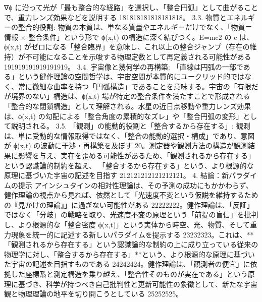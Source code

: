\documentclass{article}
\begin{document}
∇ϕ に沿って光が「最も整合的な経路」を選択し、「整合円弧」として曲がることで、重力レンズ効果などを説明する 181818181818181818。
3.3. 物質とエネルギーの整合的役割:
物質の本質は、単なる質量やエネルギーだけでなく、「物質＝情報 × 整合条件」という形で 
ϕ(x,t) の構造に深く結びつく。E=mc2 の c は、ϕ(x,t) がゼロになる「整合臨界」を意味し、これ以上の整合ジャンプ（存在の維持）が不可能になることを示唆する物理定数として再定義される可能性がある 191919191919191919。
3.4. 宇宙像と幾何学の再構築:
「直線は円弧の一部である」という健作理論の空間哲学は、宇宙空間が本質的にユークリッド的ではなく、常に微細な曲率を持つ「円弧構造」であることを意味する。宇宙の「有限だが境界のない」構造は、ϕ(x,t) 場が特定の整合条件を満たすことで形成される「整合的な閉鎖構造」として理解される。水星の近日点移動や重力レンズ効果は、ϕ(x,t) の勾配による「整合角度の累積的なズレ」や「整合円弧の変形」として説明される。
3.5. 「観測」の能動的役割と「整合するから存在する」:
観測は、単に受動的な情報取得ではなく、「整合の能動的選択・構成」であり、意図が 
ϕ(x,t) の波動に干渉・再構築を及ぼす 20。測定器や観測方法の構造が観測結果に影響を与え、実在を歪める可能性があるため、「観測されるから存在する」という認識論的制約を超え、
「整合するから存在する」という、より根源的な原理に基づいた宇宙の記述を目指す 212121212121212121。
4. 結論：新パラダイムの提示
アインシュタインの相対性理論は、その予測の成功にもかかわらず、健作理論の視点から見れば、依然として「光速度不変という仮説を維持するための『見かけの理論』」に過ぎない可能性がある 22222222。健作理論は、「反証」ではなく「分岐」の戦略を取り、光速度不変の原理という「前提の盲信」を批判し、より根源的な「整合密度 
ϕ(x,t)」という実体から時空、光、物質、そして重力現象を統一的に記述する新しいパラダイムを提示する 23232323。これは、**「観測されるから存在する」という認識論的な制約の上に成り立っている従来の物理学に対し、「整合するから存在する」**という、より根源的な原理に基づいた宇宙の記述を目指すものである 24242424。健作理論は、「観測者の便宜」に依拠した座標系と測定構造を乗り越え、「整合性そのものが実在である」という原理に基づき、科学が持つべき自己批判性と更新可能性の象徴として、新たな宇宙観と物理理論の地平を切り開こうとしている 25252525。
\end{document}
